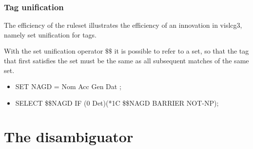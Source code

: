 \documentclass{beamer}
\begin{document}


\begin{frame}
\frametitle{Tag unification}

The efficiency of the ruleset illustrates the efficiency of an innovation in vislcg3, namely set unification for tags. 

With the set unification operator $\$\$$ it is possible to refer to a set, so that the tag that first satisfies the set must be the same as all subsequent matches of the same set.

\begin{itemize}
\item SET NAGD = Nom Acc Gen Dat ;
\item SELECT \$\$NAGD IF (0 Det)(*1C \$\$NAGD BARRIER NOT-NP);
\end{itemize}

\end{frame}


\section{The disambiguator}
\end{document}
